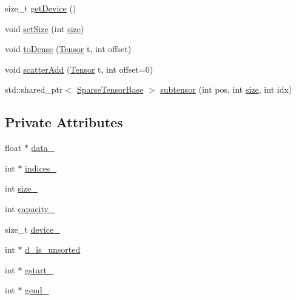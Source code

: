 \begin{DoxyCompactItemize}
\item 
size\+\_\+t \hyperlink{classmarian_1_1SparseTensorBase_a94a6cf320854651c0912cd4b36247488}{get\+Device} ()
\item 
void \hyperlink{classmarian_1_1SparseTensorBase_a251307ea1a595fd304be1eda5c28eed3}{set\+Size} (int \hyperlink{classmarian_1_1SparseTensorBase_af8c34e3fb5b12c7a65dbe6892c5ca0d1}{size})
\item 
void \hyperlink{classmarian_1_1SparseTensorBase_a137f5bf36d71f75ae77c7d8adbe7cb1a}{to\+Dense} (\hyperlink{namespacemarian_a88b71ec34bb354564cddc24eb80f7e14}{Tensor} t, int offset)
\item 
void \hyperlink{classmarian_1_1SparseTensorBase_a2ee4ca96e1f220c5883cf2d557ddd280}{scatter\+Add} (\hyperlink{namespacemarian_a88b71ec34bb354564cddc24eb80f7e14}{Tensor} t, int offset=0)
\item 
std\+::shared\+\_\+ptr$<$ \hyperlink{classmarian_1_1SparseTensorBase}{Sparse\+Tensor\+Base} $>$ \hyperlink{classmarian_1_1SparseTensorBase_af7f5d119d88cad27434eba2dc49bc848}{subtensor} (int pos, int \hyperlink{classmarian_1_1SparseTensorBase_af8c34e3fb5b12c7a65dbe6892c5ca0d1}{size}, int idx)
\end{DoxyCompactItemize}
\subsection*{Private Attributes}
\begin{DoxyCompactItemize}
\item 
float $\ast$ \hyperlink{classmarian_1_1SparseTensorBase_a633f417eb28496e8c0268e551e1992cf}{data\+\_\+}
\item 
int $\ast$ \hyperlink{classmarian_1_1SparseTensorBase_a365dfd224d685b1cc9c8006d5f608cbf}{indices\+\_\+}
\item 
int \hyperlink{classmarian_1_1SparseTensorBase_a688fe45dc53bafb2eaded0ea9303867c}{size\+\_\+}
\item 
int \hyperlink{classmarian_1_1SparseTensorBase_a141ed92eb61d17e41085f55c57446dc1}{capacity\+\_\+}
\item 
size\+\_\+t \hyperlink{classmarian_1_1SparseTensorBase_a56fcd8295b57ec3eb731cd431f80c110}{device\+\_\+}
\item 
int $\ast$ \hyperlink{classmarian_1_1SparseTensorBase_a650c5100969356a168d15b61b8f09d5f}{d\+\_\+is\+\_\+unsorted}
\item 
int $\ast$ \hyperlink{classmarian_1_1SparseTensorBase_ab8941274a48c9bf0f53785888e97e9d9}{gstart\+\_\+}
\item 
int $\ast$ \hyperlink{classmarian_1_1SparseTensorBase_a226a045c5a1148e945a177bd283c693b}{gend\+\_\+}
\end{DoxyCompactItemize}


